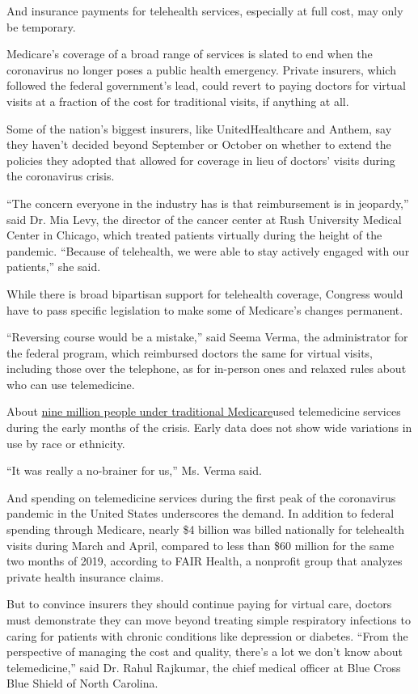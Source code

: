 And insurance payments for telehealth services, especially at full cost,
may only be temporary.

Medicare's coverage of a broad range of services is slated to end when
the coronavirus no longer poses a public health emergency. Private
insurers, which followed the federal government's lead, could revert to
paying doctors for virtual visits at a fraction of the cost for
traditional visits, if anything at all.

Some of the nation's biggest insurers, like UnitedHealthcare and Anthem,
say they haven't decided beyond September or October on whether to
extend the policies they adopted that allowed for coverage in lieu of
doctors' visits during the coronavirus crisis.

``The concern everyone in the industry has is that reimbursement is in
jeopardy,'' said Dr. Mia Levy, the director of the cancer center at Rush
University Medical Center in Chicago, which treated patients virtually
during the height of the pandemic. ``Because of telehealth, we were able
to stay actively engaged with our patients,'' she said.

While there is broad bipartisan support for telehealth coverage,
Congress would have to pass specific legislation to make some of
Medicare's changes permanent.

``Reversing course would be a mistake,'' said Seema Verma, the
administrator for the federal program, which reimbursed doctors the same
for virtual visits, including those over the telephone, as for in-person
ones and relaxed rules about who can use telemedicine.

About
\href{https://www.healthaffairs.org/do/10.1377/hblog20200715.454789/full/}{nine
million people under traditional Medicare}used telemedicine services
during the early months of the crisis. Early data does not show wide
variations in use by race or ethnicity.

``It was really a no-brainer for us,'' Ms. Verma said.

And spending on telemedicine services during the first peak of the
coronavirus pandemic in the United States underscores the demand. In
addition to federal spending through Medicare, nearly \$4 billion was
billed nationally for telehealth visits during March and April, compared
to less than \$60 million for the same two months of 2019, according to
FAIR Health, a nonprofit group that analyzes private health insurance
claims.

But to convince insurers they should continue paying for virtual care,
doctors must demonstrate they can move beyond treating simple
respiratory infections to caring for patients with chronic conditions
like depression or diabetes. ``From the perspective of managing the cost
and quality, there's a lot we don't know about telemedicine,'' said Dr.
Rahul Rajkumar, the chief medical officer at Blue Cross Blue Shield of
North Carolina.

